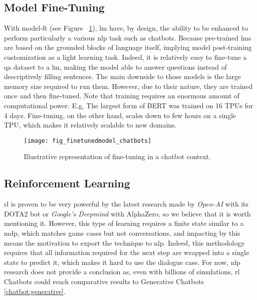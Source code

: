 \subsection{Model Fine-Tuning}
\label{chatbot:finetuning}
With \gls{model-ft} (see Figure ~\ref{fig:fig_finetunedmodel_chatbots}), \gls{lm} have, by design, the ability to be enhanced to perform particularly a various \gls{nlp} task such as chatbots. Because pre-trained \glspl{lm} are based on the grounded blocks of language itself, implying model post-training customization as a light learning task. Indeed, it is relatively easy to fine-tune a \gls{qa} dataset to a \gls{lm}, making the model able to answer questions instead of descriptively filling sentences. The main downside to those models is the large memory size required to run them. However, due to their nature, they are trained once and then fine-tuned. Note that training requires an enormous amount of computational power. E.g, The largest form of BERT \autocite{paper:devlin-etal-2019-bert} was trained on 16 TPUs for 4 days. Fine-tuning, on the other hand, scales down to few hours on a single TPU, which makes it relatively scalable to new domains.

\begin{figure}
    \centering
    \texttt{[image: fig\_finetunedmodel\_chatbots]}
    \caption{Illustrative representation of fine-tuning in a chatbot context.}
    \label{fig:fig_finetunedmodel_chatbots}
\end{figure}

\subsection{Reinforcement Learning}
\gls{rl} is proven to be very powerful by the latest research made by \textit{Open-AI} with its DOTA2 bot or \textit{Google's Deepmind} with AlphaZero, so we believe that it is worth mentioning it. However, this type of learning requires a finite state similar to a \gls{mdp}, which matches game cases but not conversations, and impacting by this means the motivation to export the technique to \gls{nlp}. Indeed, this methodology requires that all information required for the next step are wrapped into a single state to predict it, which makes it hard to use the dialogue case. For now, \gls{nlp} research does not provide a conclusion as, even with billions of simulations, \gls{rl} Chatbots could reach comparative results to Generative Chatbots \ref{chatbot:generative}.

